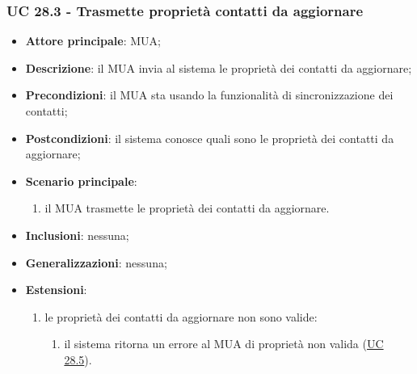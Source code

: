     \subsubsection{UC 28.3 - Trasmette proprietà contatti da aggiornare} \label{sec:UC28.3}
    \begin{itemize}
        \item \textbf{Attore principale}: MUA;
        \item \textbf{Descrizione}: il MUA invia al sistema le proprietà dei contatti da aggiornare;
        \item \textbf{Precondizioni}: il MUA sta usando la funzionalità di sincronizzazione dei contatti;
        \item \textbf{Postcondizioni}: il sistema conosce quali sono le proprietà dei contatti da aggiornare;
        \item \textbf{Scenario principale}:
            \begin{enumerate}
                \item il MUA trasmette le proprietà dei contatti da aggiornare.
            \end{enumerate}
        \item \textbf{Inclusioni}: nessuna;
        \item \textbf{Generalizzazioni}: nessuna;
        \item \textbf{Estensioni}:
            \begin{enumerate}[label=\alph*.]
                \item le proprietà dei contatti da aggiornare non sono valide:
                \begin{enumerate}[label=\arabic*.]
                    \item il sistema ritorna un errore al MUA di proprietà non valida (\hyperref[sec:UC28.5]{UC 28.5}).
                \end{enumerate}
            \end{enumerate}
    \end{itemize}


